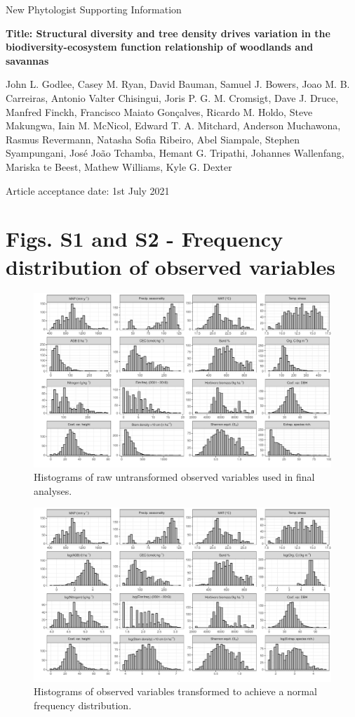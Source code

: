 \documentclass[11pt,a4paper]{article}
\begin{document}
{\Large{New Phytologist Supporting Information}}

{\textbf{Title: Structural diversity and tree density drives variation in the biodiversity-ecosystem function relationship of woodlands and savannas}}

John L. Godlee, Casey M. Ryan, David Bauman, Samuel J. Bowers, Joao M. B. Carreiras, Antonio Valter Chisingui, Joris P. G. M. Cromsigt, Dave J. Druce, Manfred Finckh, Francisco Maiato Gon\c{c}alves, Ricardo M. Holdo, Steve Makungwa, Iain M. McNicol, Edward T. A. Mitchard, Anderson Muchawona, Rasmus Revermann, Natasha Sofia Ribeiro, Abel Siampale, Stephen Syampungani, Jos\'{e} Jo\~{a}o Tchamba, Hemant G. Tripathi, Johannes Wallenfang, Mariska te Beest, Mathew Williams, Kyle G. Dexter

Article acceptance date: 1st July 2021

\section*{Figs. S1 and S2 - Frequency distribution of observed variables} \label{appendixa}

\begin{figure}[H]
\centering
	\includegraphics[width=\textwidth]{hist_raw}
	\caption{Histograms of raw untransformed observed variables used in final analyses.}
	\label{hist_raw}
\end{figure}

\begin{figure}[H]
\centering
	\includegraphics[width=\textwidth]{hist_trans}
	\caption{Histograms of observed variables transformed to achieve a normal frequency distribution.}
	\label{hist_trans}
\end{figure}
\end{document}
